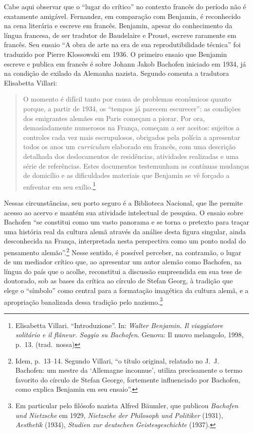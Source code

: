 Cabe aqui observar que o ``lugar do crítico'' no contexto francês do
período não é exatamente amigável. Fernandez, em comparação com
Benjamin, é reconhecido na cena literária e escreve em francês.
Benjamin, apesar do conhecimento da língua francesa, de ser tradutor de
Baudelaire e Proust, escreve raramente em francês. Seu ensaio ``A obra
de arte na era de sua reprodutibilidade técnica'' foi traduzido por
Pierre Klossowski em 1936. O primeiro ensaio que Benjamin escreve e
publica em francês é sobre Johann Jakob Bachofen iniciado em 1934, já na
condição de exilado da Alemanha nazista. Segundo comenta a tradutora
Elisabetta Villari:

\begin{quote}
O momento é difícil tanto por causa de problemas econômicos quanto
porque, a partir de 1934, os ``tempos já parecem escurecer'': as
condições dos emigrantes alemães em Paris começam a piorar. Por ora,
demasiadamente numerosos na França, começam a ser aceitos: sujeitos a
controles cada vez mais escrupulosos, obrigados pela polícia a
apresentar todos os anos um \emph{curriculum} elaborado em francês, com
uma descrição detalhada dos deslocamentos de residências, atividades
realizadas e uma série de referências. Estes documentos testemunham as
contínuas mudanças de domicílio e as dificuldades materiais que Benjamin
se vê forçado a enfrentar em seu exílio.\footnote{Elisabetta Villari. ``Introduzione''. 
  In: \emph{Walter Benjamin. Il viaggiatore solitário e il flâneur.
  Saggio su Bachofen}. Genova: Il nuovo melangolo, 1998, p.~13. (trad.~nossa)}
\end{quote}

Nessas circunstâncias, seu porto seguro é a Biblioteca Nacional, que lhe
permite acesso ao acervo e mantém sua atividade intelectual de pesquisa.
O ensaio sobre Bachofen ``se constitui como um vasto panorama e se torna
o pretexto para traçar uma história real da cultura alemã através da
análise desta figura singular, ainda desconhecida na França,
interpretada nesta perspectiva como um ponto nodal do pensamento
alemão''.\footnote{Idem, p.~13--14. Segundo Villari, ``o título original,
  relatado no J.~J. Bachofen: um mestre da `Allemagne inconnue', utiliza
  precisamente o termo favorito do círculo de Stefan George, fortemente
  influenciado por Bachofen, como explica Benjamin em seu ensaio''.}
Nesse sentido, é possível perceber, na contramão, o lugar de um mediador
crítico que, ao apresentar um autor alemão como Bachofen, na língua do
país que o acolhe, reconstitui a discussão empreendida em sua tese de
doutorado, sob as bases da crítica ao círculo de Stefan Georg, à
tradição que elege o ``símbolo'' como central para a formatação
imagética da cultura alemã, e a apropriação banalizada dessa tradição
pelo nazismo.\footnote{Em particular pelo filósofo nazista Alfred
  Bäumler, que publicou \emph{Bachofen und Nietzsche} em 1929,
  \emph{Nietzsche der Philosoph und Politiker} (1931), \emph{Aesthetik}
  (1934), \emph{Studien zur deutschen Geistesgeschichte} (1937).}

